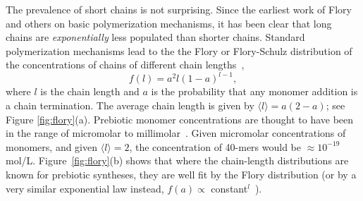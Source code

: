 \documentclass[5p,times]{elsarticle}
\begin{document}
The prevalence of short chains is not surprising.  Since the earliest work of Flory and others 
on basic polymerization mechanisms, it has been clear that long chains are \textit{exponentially} 
less populated than shorter chains.  
Standard polymerization mechanisms lead to the the Flory or Flory-Schulz distribution of the 
concentrations of chains of different chain lengths~\cite{Flory1953}, 
\begin{equation}
 f(l)=a^2l(1-a)^{l-1},\label{eq:flory}
\end{equation} 
where $l$ is the chain length and $a$ is the probability that any monomer addition is a chain 
termination.  The average chain length is given by $\langle l \rangle = a(2- a)$; see Figure 
\ref{fig:flory}(a).  Prebiotic monomer concentrations are thought to have been in the range of 
micromolar to millimolar~\cite{Stribling1987,Huber1998,Aubrey2009,Kanavarioti2001,Lazcano1996}.  
Given micromolar concentrations of monomers, and given $\langle l \rangle = 2$, the concentration 
of 40-mers would be $\approx 10^{-19} $ mol/L.  Figure~\ref{fig:flory}(b) shows that where the 
chain-length distributions are known for prebiotic syntheses, they are well fit by the Flory 
distribution (or by a very similar exponential law instead, $f(a)\propto$ 
constant$^l$~\cite{nowak2008prevolutionary,Derr2012}).
\end{document}

